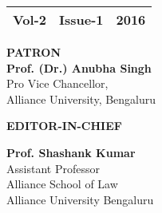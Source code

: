 
{\hspace{2.5cm}{\centering\bf INTERNATIONAL JOURNAL OF LAW SOCIAL SCIENCES}}

\vspace{1cm}

\renewcommand{\arraystretch}{1.5}
\setlength{\arrayrulewidth}{1.3pt}
{\fontsize{13}{16}\selectfont\begin{tabular}{@{}p{70mm}@{}p{75mm}@{}p{10mm}@{}}
\hline
{\bf Vol-2} & {\bf Issue-1} & {\bf 2016}\\
\hline
\end{tabular}}

\vspace{1cm}

\label{2016-editorial-board}

\noi
\textbf{PATRON}\\
\textbf{Prof. (Dr.) Anubha Singh }\\
Pro Vice Chancellor,\\
Alliance University, Bengaluru

\vspace{1cm}
\noi
\textbf{EDITOR-IN-CHIEF}

\noi
\textbf{Prof. Shashank Kumar}\\
Assistant Professor\\
Alliance School of Law \\
Alliance University Bengaluru \\
